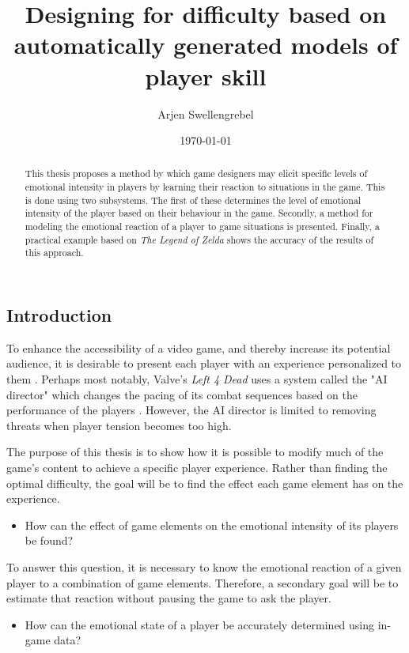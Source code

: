 \documentclass[a4paper]{article}
\title{Designing for difficulty based on automatically generated models of player skill}
\author{Arjen Swellengrebel}
\date{\today}
\begin{document}
\maketitle

\begin{multicols*}{2}
\begin{abstract}
This thesis proposes a method by which game designers may elicit specific levels of emotional intensity in players by learning their reaction to situations in the game.
This is done using two subsystems. The first of these determines the level of emotional intensity of the player based on their behaviour in the game.
Secondly, a method for modeling the emotional reaction of a player to game situations is presented.
Finally, a practical example based on \emph{The Legend of Zelda} shows the accuracy of the results of this approach.
\end{abstract}

\section{Introduction}
To enhance the accessibility of a video game, and thereby increase its potential audience, it is desirable to present each player with an experience personalized to them \cite{playercentered}. Perhaps most notably, Valve's \emph{Left 4 Dead} uses a system called the "AI director" which changes the pacing of its combat sequences based on the performance of the players \cite{left4dead}. However, the AI director is limited to removing threats when player tension becomes too high.

The purpose of this thesis is to show how it is possible to modify much of the game's content to achieve a specific player experience. Rather than finding the optimal difficulty, the goal will be to find the effect each game element has on the experience.
\begin{itemize} \item[\textbf{1.}] How can the effect of game elements on the emotional intensity of its players be found? \end{itemize}
To answer this question, it is necessary to know the emotional reaction of a given player to a combination of game elements. Therefore, a secondary goal will be to estimate that reaction without pausing the game to ask the player.
\begin{itemize} \item[\textbf{2.}] How can the emotional state of a player be accurately determined using in-game data? \end{itemize}


\end{multicols*}
\end{document}
